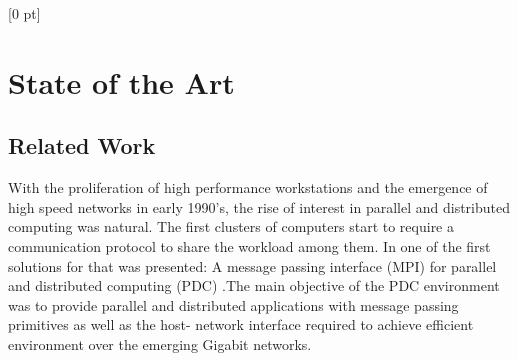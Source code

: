 \titlespacing{\chapter}{0 pt}{30 pt}{50 pt}[0 pt]
\titleformat{\section}{\Large\bfseries}{\thesection}{0 pt}{\hspace{30 pt}}
\titleformat{\subsection}{\large\bfseries}{\thesubsection}{0 pt}{\hspace{30 pt}}
\pagestyle{fancy}
\fancyhead[LO,LE]{\footnotesize\textit{\leftmark}}
\fancyhead[RO,RE]{\thepage}
\fancyfoot[CO,CE]{}

\chapter{State of the Art} %

\normalsize

\section{Related Work}
\noindent



With the proliferation of high performance workstations and the emergence of
high speed networks in early 1990's, the rise of interest in parallel and
distributed computing was natural. The first clusters of computers start to
require a communication protocol to share the workload among them. In
\cite{Salim} one of the first solutions for that was presented: A message
passing interface (MPI) for parallel and distributed computing (PDC) .The main
objective of the PDC environment was to provide parallel and distributed
applications with message passing primitives as well as the host- network
interface required to achieve efficient environment over the emerging Gigabit
networks.

